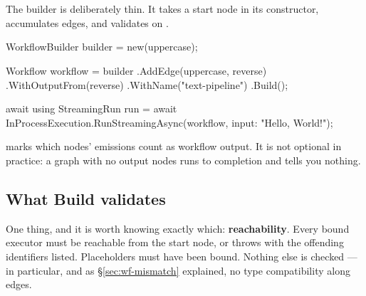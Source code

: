 
\section{\texorpdfstring{}{WorkflowBuilder}}
\label{sec:wf-builder}

The builder is deliberately thin. It takes a start node in its constructor,
accumulates edges, and validates on .

\begin{csharp}[caption={Building and running a graph}, label={lst:wf-builder}]
WorkflowBuilder builder = new(uppercase);

Workflow workflow = builder
    .AddEdge(uppercase, reverse)
    .WithOutputFrom(reverse)
    .WithName("text-pipeline")
    .Build();

await using StreamingRun run =
    await InProcessExecution.RunStreamingAsync(workflow, input: "Hello, World!");
\end{csharp}

 marks which nodes' emissions count as workflow output. It is
not optional in practice: a graph with no output nodes runs to completion and
tells you nothing.

\subsection{What Build validates}

One thing, and it is worth knowing exactly which: \textbf{reachability}. Every
bound executor must be reachable from the start node, or  throws
with the offending identifiers listed. Placeholders must have been bound. Nothing
else is checked --- in particular, and as \S\ref{sec:wf-mismatch} explained, no
type compatibility along edges.

